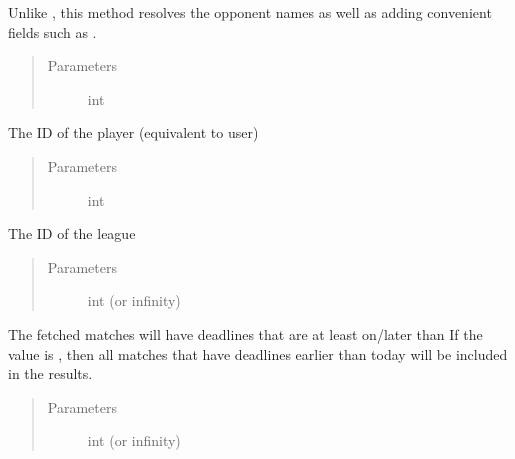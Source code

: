 \documentclass[letterpaper,10pt,english]{sphinxmanual}
\begin{document}

\begin{fulllineitems}
\label{\detokenize{tiger_leagues/models/readme:tiger_leagues.models.league_model.get_players_current_matches}}
Unlike , this method resolves the 
opponent names as well as adding convenient fields such as .
\begin{quote}\begin{description}
\item[{Parameters}] \leavevmode
{} \textendash{} int

\end{description}\end{quote}

The ID of the player (equivalent to user)
\begin{quote}\begin{description}
\item[{Parameters}] \leavevmode
{} \textendash{} int

\end{description}\end{quote}

The ID of the league
\begin{quote}\begin{description}
\item[{Parameters}] \leavevmode
{} \textendash{} int (or infinity)

\end{description}\end{quote}

The fetched matches will have deadlines that are at least on/later than 
If the value is , then all matches that have deadlines earlier than 
today will be included in the results.
\begin{quote}\begin{description}
\item[{Parameters}] \leavevmode
{} \textendash{} int (or infinity)


\end{description}
\end{quote}
\end{fulllineitems}
\end{document}

